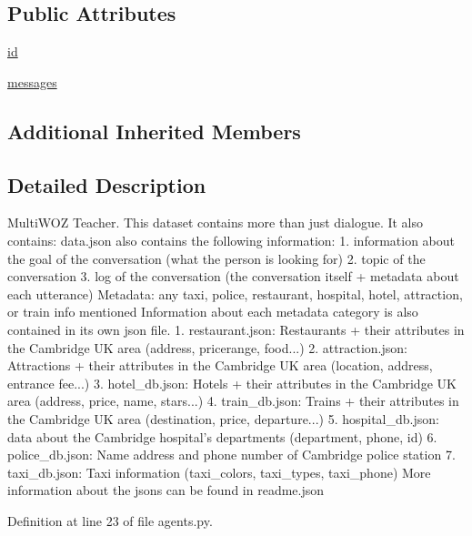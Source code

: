 \subsection*{Public Attributes}
\begin{DoxyCompactItemize}
\item 
\hyperlink{classparlai_1_1tasks_1_1multiwoz_1_1agents_1_1MultiWozTeacher_a8e59cea446db2909435c9bac275e2539}{id}
\item 
\hyperlink{classparlai_1_1tasks_1_1multiwoz_1_1agents_1_1MultiWozTeacher_a40d3917ab5dadef1f822ac3c1d06c915}{messages}
\end{DoxyCompactItemize}
\subsection*{Additional Inherited Members}


\subsection{Detailed Description}
\begin{DoxyVerb}    MultiWOZ Teacher.
    This dataset contains more than just dialogue. It also contains:
    data.json also contains the following information:
    1. information about the goal of the conversation (what the person is looking for)
    2. topic of the conversation
    3. log of the conversation (the conversation itself + metadata about each utterance)
          Metadata: any taxi, police, restaurant, hospital, hotel, attraction, or train info mentioned
    Information about each metadata category is also contained in its own json file.
    1. restaurant.json: Restaurants + their attributes in the Cambridge UK area (address, pricerange, food...)
    2. attraction.json: Attractions + their attributes in the Cambridge UK area (location, address, entrance fee...)
    3. hotel_db.json: Hotels + their attributes in the Cambridge UK area  (address, price, name, stars...)
    4. train_db.json: Trains + their attributes in the Cambridge UK area (destination, price, departure...)
    5. hospital_db.json: data about the Cambridge hospital's departments (department, phone, id)
    6. police_db.json: Name address and phone number of Cambridge police station
    7. taxi_db.json: Taxi information (taxi_colors, taxi_types, taxi_phone)
    More information about the jsons can be found in readme.json
\end{DoxyVerb}
 

Definition at line 23 of file agents.\+py.



